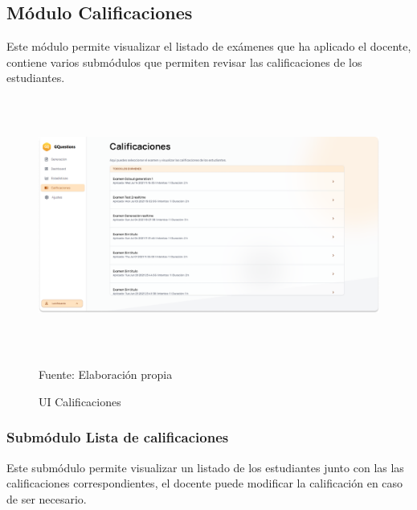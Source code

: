 \documentclass[../Main.tex]{subfiles}
\begin{document}
    \subsection{Módulo Calificaciones}
    \begin{justify}
    Este módulo permite visualizar el listado de exámenes que ha aplicado el docente, contiene varios submódulos que permiten revisar las calificaciones de los estudiantes. 
    \end{justify}
    
    \begin{figure}[H]
	\begin{Center}
		\includegraphics[width=6.4in,height=3.3in]{Images/ui_docente_calificaciones.png}
	    \caption{UI Calificaciones}
	    Fuente: Elaboración propia
        \label{fig:section}
	\end{Center}
    \end{figure}
    
    \subsubsection{Submódulo Lista de calificaciones}
    \begin{justify}
    Este submódulo permite visualizar un listado de los estudiantes junto con las las calificaciones correspondientes, el docente puede modificar la calificación en caso de ser necesario.
    \end{justify}
\end{document}

